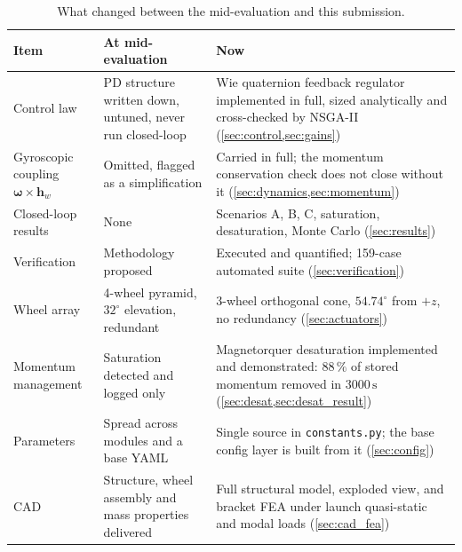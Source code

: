 \documentclass[conference,10pt,a4paper]{IEEEtran}
\newcommand{\vect}[1]{\bm{#1}}
\newcommand{\unit}[1]{\ensuremath{\,\mathrm{#1}}}
\begin{document}
\begin{table}[!t]
\centering
\caption{What changed between the mid-evaluation and this submission.}
\label{tab:whatchanged}
\footnotesize
\begin{tabularx}{\textwidth}{@{}p{}p{}X@{}}
\toprule
\textbf{Item} & \textbf{At mid-evaluation} & \textbf{Now} \\
\midrule
Control law &
PD structure written down, untuned, never run closed-loop &
Wie quaternion feedback regulator implemented in full, sized analytically and
cross-checked by NSGA-II (\cref{sec:control,sec:gains}) \\[3pt]

Gyroscopic coupling $\vect{\omega}\times\vect{h}_w$ &
Omitted, flagged as a simplification &
Carried in full; the momentum conservation check does not close without it
(\cref{sec:dynamics,sec:momentum}) \\[3pt]

Closed-loop results &
None &
Scenarios A, B, C, saturation, desaturation, Monte Carlo (\cref{sec:results}) \\[3pt]

Verification &
Methodology proposed &
Executed and quantified; 159-case automated suite (\cref{sec:verification}) \\[3pt]

Wheel array &
4-wheel pyramid, $32^\circ$ elevation, redundant &
3-wheel orthogonal cone, $54.74^\circ$ from $+z$, no redundancy
(\cref{sec:actuators}) \\[3pt]

Momentum management &
Saturation detected and logged only &
Magnetorquer desaturation implemented and demonstrated: $88\,\%$ of stored
momentum removed in $3000\unit{s}$ (\cref{sec:desat,sec:desat_result}) \\[3pt]

Parameters &
Spread across modules and a base YAML &
Single source in \texttt{constants.py}; the base config layer is built from it
(\cref{sec:config}) \\[3pt]

CAD &
Structure, wheel assembly and mass properties delivered &
Full structural model, exploded view, and bracket FEA under launch
quasi-static and modal loads (\cref{sec:cad_fea}) \\
\bottomrule
\end{tabularx}
\end{table}
\end{document}
